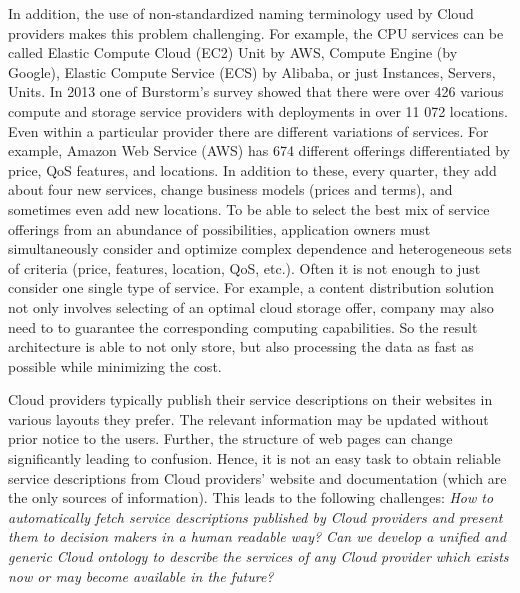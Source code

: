In addition, the use of non-standardized naming terminology used by Cloud
providers makes this problem challenging. For example, the CPU services 
can be called Elastic Compute Cloud (EC2) Unit by AWS, Compute Engine (by Google), 
Elastic Compute Service (ECS) by Alibaba, or just Instances, Servers, Units.
In 2013 one of Burstorm's \cite{Burstorm} survey showed that
there were over 426 various compute and
storage service providers with deployments in over 11 072
locations. Even within a particular provider there are different
variations of services. 
For example, Amazon Web Service
(AWS) has 674 different offerings differentiated by price, QoS
features, and locations. In addition to these, every quarter, they add
about four new services, change business models (prices and
terms), and sometimes even add new locations. To be able to
select the best mix of service offerings from an abundance of
possibilities, application owners must simultaneously consider
and optimize complex dependence and heterogeneous sets of
criteria (price, features, location, QoS, etc.). 
Often it is not enough to just consider one single type of service.
For example, a content distribution solution not only involves
selecting of an optimal cloud storage offer,
company may also need to to guarantee the corresponding computing capabilities.
So the result architecture is able to not only store,
but also processing the data as fast as possible while minimizing the cost.

Cloud providers typically publish their service
descriptions on their websites in various layouts they prefer.
The relevant information may be updated without prior
notice to the users. Further, the structure of web pages can
change significantly leading to confusion. Hence, it is not an
easy task to obtain reliable service descriptions from Cloud
providers’ website and documentation (which are the only
sources of information). This leads to the following
challenges: 
\textit{How to automatically fetch service descriptions
published by Cloud providers and present them to decision
makers in a human readable way? Can we develop a unified
and generic Cloud ontology to describe the services of any
Cloud provider which exists now or may become available in
the future?} 
 
